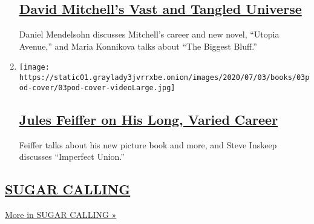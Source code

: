 \begin{enumerate}
  \hypertarget{david-mitchells-vast-and-tangled-universe}{%
  \subsection{\texorpdfstring{\href{/2020/07/10/books/review/david-mitchell-utopia-avenue-daniel-mendelsohn-biggest-bluff-poker-maria-konnikova.html}{David
  Mitchell's Vast and Tangled
  Universe}}{David Mitchell's Vast and Tangled Universe}}\label{david-mitchells-vast-and-tangled-universe}}

  Daniel Mendelsohn discusses Mitchell's career and new novel, ``Utopia
  Avenue,'' and Maria Konnikova talks about ``The Biggest Bluff.''
\item
  \texttt{[image: https://static01.graylady3jvrrxbe.onion/images/2020/07/03/books/03pod-cover/03pod-cover-videoLarge.jpg]}

  \hypertarget{jules-feiffer-on-his-long-varied-career}{%
  \subsection{\texorpdfstring{\href{/2020/07/03/books/review/podcast-jules-feiffer-smart-george-steve-inskeep-imperfect-union.html}{Jules
  Feiffer on His Long, Varied
  Career}}{Jules Feiffer on His Long, Varied Career}}\label{jules-feiffer-on-his-long-varied-career}}

  Feiffer talks about his new picture book and more, and Steve Inskeep
  discusses ``Imperfect Union.''
\end{enumerate}

\hypertarget{sugar-calling}{%
\subsection{\texorpdfstring{\href{/column/sugar-calling}{SUGAR
CALLING}}{SUGAR CALLING}}\label{sugar-calling}}

\href{/column/sugar-calling}{More in SUGAR CALLING »}

